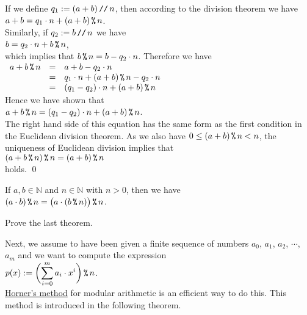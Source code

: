 \proof
If we define $q_1 := (a + b) \,\texttt{//}\, n$, then according to the division theorem we have 
\\[0.2cm]
\hspace*{1.3cm}
$a + b = q_1 \cdot n + (a + b) \,\texttt{\%}\, n$. 
\\[0.2cm]
Similarly, if $q_2 := b \,\texttt{//}\, n$ we have
\\[0.2cm]
\hspace*{1.3cm}
$b = q_2 \cdot n + b \,\texttt{\%}\, n$,
\\[0.2cm]
which implies that $b \,\texttt{\%}\, n = b - q_2 \cdot n$.
Therefore we have
\\[0.2cm]
\hspace*{1.3cm}
$
\begin{array}[t]{lcl}
  a + b \,\texttt{\%}\, n & = & a + b - q_2 \cdot n \\
                & = & q_1 \cdot n + (a + b) \,\texttt{\%}\, n - q_2 \cdot n \\
                & = & (q_1 - q_2) \cdot n + (a + b) \,\texttt{\%}\, n
\end{array}
$
\\[0.2cm]
Hence we have shown that
\\[0.2cm]
\hspace*{1.3cm}
$a + b \,\texttt{\%}\, n = (q_1 - q_2) \cdot n + (a + b) \,\texttt{\%}\, n$.
\\[0.2cm]
The right hand side of this equation has the same form as the first condition in the Euclidean division theorem.
As we also have $0 \leq (a + b) \,\texttt{\%}\, n < n$, the uniqueness of Euclidean division implies that
\\[0.2cm]
\hspace*{1.3cm}
$(a + b \,\texttt{\%}\, n) \,\texttt{\%}\, n = (a + b) \,\texttt{\%}\, n$
\\[0.2cm]
holds.  \qed

\begin{Theorem} \lb
  If $a, b \in \mathbb{N}$ and $n \in \mathbb{N}$ with $n > 0$, then we have
  \\[0.2cm]
  \hspace*{1.3cm}
  $\displaystyle (a \cdot b) \,\texttt{\%}\, n = \bigl(a \cdot (b \,\texttt{\%}\, n)\bigr) \,\texttt{\%}\, n$.
\end{Theorem}

\exercise
Prove the last theorem. \eox

Next, we assume to have been given a finite sequence of numbers $a_0$, $a_1$, $a_2$, $\cdots$, $a_m$  and we want to compute the expression
\\[0.2cm]
\hspace*{1.3cm}
$\displaystyle p(x) := \biggl(\sum\limits_{i=0}^m a_i \cdot x^i\biggr) \,\texttt{\%}\, n$.
\\[0.2cm]
\href{https://en.wikipedia.org/wiki/Horner%27s_method}{Horner's method}
for modular arithmetic is an efficient way to do this.  This method is introduced in the following theorem.

